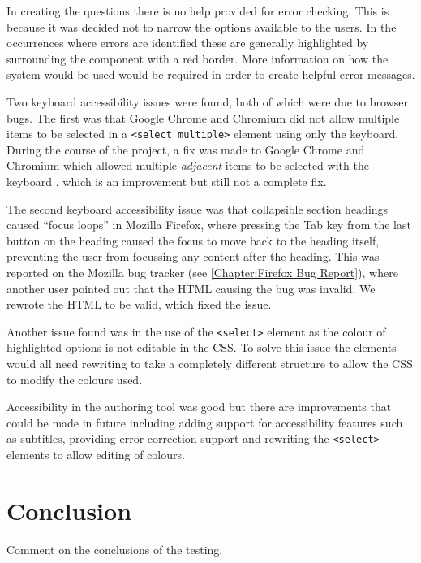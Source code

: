 In creating the questions there is no help provided for error checking. This is because it was decided not to narrow the options available to the users. In the occurrences where errors are identified these are generally highlighted by surrounding the component with a red border. More information on how the system would be used would be required in order to create helpful error messages.

Two keyboard accessibility issues were found, both of which were due to browser bugs. The first was that Google Chrome and Chromium did not allow multiple items to be selected in a \texttt{\textless select multiple\textgreater} element using only the keyboard. During the course of the project, a fix was made to Google Chrome and Chromium which allowed multiple \textit{adjacent} items to be selected with the keyboard \citep{ChromiumMultipleSelectBug}, which is an improvement but still not a complete fix.

The second keyboard accessibility issue was that collapsible section headings caused ``focus loops'' in Mozilla Firefox, where pressing the Tab key from the last button on the heading caused the focus to move back to the heading itself, preventing the user from focussing any content after the heading. This was reported on the Mozilla bug tracker \citep{FirefoxFocusLoopBug} (see \autoref{Chapter:Firefox Bug Report}), where another user pointed out that the HTML causing the bug was invalid. We rewrote the HTML to be valid, which fixed the issue.

Another issue found was in the use of the \texttt{\textless select\textgreater} element as the colour of highlighted options is not editable in the \gls{CSS}. To solve this issue the elements would all need rewriting to take a completely different structure to allow the \gls{CSS} to modify the colours used.

Accessibility in the authoring tool was good but there are improvements that could be made in future including adding support for accessibility features such as subtitles, providing error correction support and rewriting the \texttt{\textless select\textgreater} elements to allow editing of colours.


\section{Conclusion}

Comment on the conclusions of the testing.

